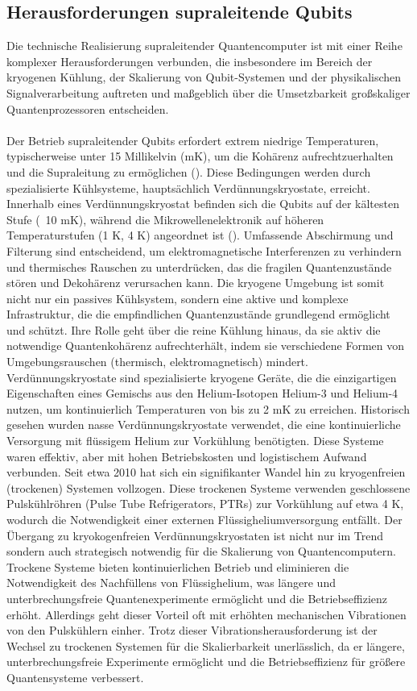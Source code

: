 \subsection{Herausforderungen supraleitende Qubits}
Die technische Realisierung supraleitender Quantencomputer ist mit einer Reihe komplexer Herausforderungen verbunden, die insbesondere im Bereich der kryogenen Kühlung, der Skalierung von Qubit-Systemen und der physikalischen Signalverarbeitung auftreten und maßgeblich über die Umsetzbarkeit großskaliger Quantenprozessoren entscheiden.
\\\\
Der Betrieb supraleitender Qubits erfordert extrem niedrige Temperaturen, typischerweise unter 15 Millikelvin (mK), um die Kohärenz aufrechtzuerhalten und die Supraleitung zu ermöglichen (\cite{noauthor_ultimate_2025}). Diese Bedingungen werden durch spezialisierte Kühlsysteme, hauptsächlich Verdünnungskryostate, erreicht. Innerhalb eines Verdünnungskryostat befinden sich die Qubits auf der kältesten Stufe (~10 mK), während die Mikrowellenelektronik auf höheren Temperaturstufen (1 K, 4 K) angeordnet ist (\cite{noauthor_what_nodate}). Umfassende Abschirmung und Filterung sind entscheidend, um elektromagnetische Interferenzen zu verhindern und thermisches Rauschen zu unterdrücken, das die fragilen Quantenzustände stören und Dekohärenz verursachen kann. Die kryogene Umgebung ist somit nicht nur ein passives Kühlsystem, sondern eine aktive und komplexe Infrastruktur, die die empfindlichen Quantenzustände grundlegend ermöglicht und schützt. Ihre Rolle geht über die reine Kühlung hinaus, da sie aktiv die notwendige Quantenkohärenz aufrechterhält, indem sie verschiedene Formen von Umgebungsrauschen (thermisch, elektromagnetisch) mindert. Verdünnungskryostate sind spezialisierte kryogene Geräte, die die einzigartigen Eigenschaften eines Gemischs aus den Helium-Isotopen Helium-3 und Helium-4 nutzen, um kontinuierlich Temperaturen von bis zu 2 mK zu erreichen. Historisch gesehen wurden \grqq nasse\grqq{} Verdünnungskryostate verwendet, die eine kontinuierliche Versorgung mit flüssigem Helium zur Vorkühlung benötigten. Diese Systeme waren effektiv, aber mit hohen Betriebskosten und logistischem Aufwand verbunden. Seit etwa 2010 hat sich ein signifikanter Wandel hin zu kryogenfreien (\grqq trockenen\grqq{}) Systemen vollzogen. Diese trockenen Systeme verwenden geschlossene Pulskühlröhren (Pulse Tube Refrigerators, PTRs) zur Vorkühlung auf etwa 4 K, wodurch die Notwendigkeit einer externen Flüssigheliumversorgung entfällt. Der Übergang zu kryokogenfreien Verdünnungskryostaten ist nicht nur im Trend sondern auch strategisch notwendig für die Skalierung von Quantencomputern. Trockene Systeme bieten kontinuierlichen Betrieb und eliminieren die Notwendigkeit des Nachfüllens von Flüssighelium, was längere und unterbrechungsfreie Quantenexperimente ermöglicht und die Betriebseffizienz erhöht. Allerdings geht dieser Vorteil oft mit erhöhten mechanischen Vibrationen von den Pulskühlern einher. Trotz dieser Vibrationsherausforderung ist der Wechsel zu trockenen Systemen für die Skalierbarkeit unerlässlich, da er längere, unterbrechungsfreie Experimente ermöglicht und die Betriebseffizienz für größere Quantensysteme verbessert. 
